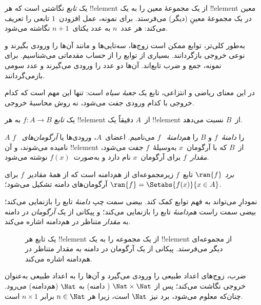 \documentclass[../../../include/open-logic-section]{subfiles}
\begin{document}

\begin{explain}
یک \emph{تابع} نگاشتی است که هر !!{element} از یک مجموعهٔ معین را
به یک !!{element} معین در یک مجموعهٔ معینِ (دیگر) می‌فرستد. برای نمونه،
عمل افزودن~$1$ تابعی را تعریف می‌کند: هر عدد~$n$ به
عدد یکتای~$n+1$ نگاشته می‌شود.

به‌طور کلی‌تر، توابع ممکن است زوج‌ها، سه‌تایی‌ها و مانند آن‌ها را ورودی بگیرند و
نوعی خروجی بازگردانند. بسیاری از توابع را از
حساب مقدماتی می‌شناسیم. برای نمونه، جمع و ضرب
تابع‌اند. آن‌ها دو عدد را ورودی می‌گیرند و عدد سومی بازمی‌گردانند.

در این معنای ریاضی و انتزاعی، تابع یک \emph{جعبهٔ
سیاه} است: تنها این مهم است که کدام خروجی با کدام ورودی جفت می‌شود، نه
روش محاسبهٔ خروجی.
\end{explain}

\begin{defn}[تابع]
یک \emph{تابع} $f \colon A \to B$ به هر !!{element}
از~$A$ دقیقاً یک !!{element} از~$B$ نسبت می‌دهد.

$A$ را \emph{دامنهٔ}~$f$ و $B$ را \emph{هم‌دامنهٔ}
~$f$ می‌نامیم. اعضای~$A$، ورودی‌ها یا \emph{آرگومان‌های}
~$f$ نامیده می‌شوند، و آن !!{element} از~$B$ که با آرگومان~$x$
به‌وسیلهٔ~$f$ جفت می‌شود، \emph{مقدار~$f$} برای آرگومان~$x$ نام دارد و
به‌صورت~$f(x)$ نوشته می‌شود.

\emph{برد} $\ran{f}$ تابع~$f$ زیرمجموعه‌ای از هم‌دامنه است
که از همهٔ مقادیر~$f$ برای آرگومان‌های دامنه تشکیل می‌شود؛ $\ran{f} =
\Setabs{f(x)}{x \in A}$.
\end{defn}

نمودارِ  می‌تواند به فهم توابع کمک کند. بیضی
سمت چپ \emph{دامنهٔ} تابع را بازنمایی می‌کند؛ بیضی سمت
راست \emph{هم‌دامنهٔ} تابع را بازنمایی می‌کند؛ و پیکانی
از یک \emph{آرگومان} در دامنه به
\emph{مقدار} متناظر در هم‌دامنه اشاره می‌کند.

\begin{figure}
  \caption{یک تابع هر !!{element} از یک مجموعه را به
    یک !!{element} از مجموعه‌ای دیگر می‌فرستد. پیکانی از یک آرگومان در
    دامنه به مقدار متناظر در هم‌دامنه اشاره می‌کند.}
\end{figure}

\begin{ex}
ضرب، زوج‌های اعداد طبیعی را ورودی می‌گیرد و آن‌ها را
به اعداد طبیعی به‌عنوان خروجی نگاشت می‌کند؛ پس از $\Nat \times \Nat$ (
دامنه) به $\Nat$ (هم‌دامنه) می‌رود. چنان‌که معلوم می‌شود، برد نیز
$\Nat$ است، زیرا هر $n \in \Nat$ برابر $n \times 1$ است.
\end{ex}
\end{document}
